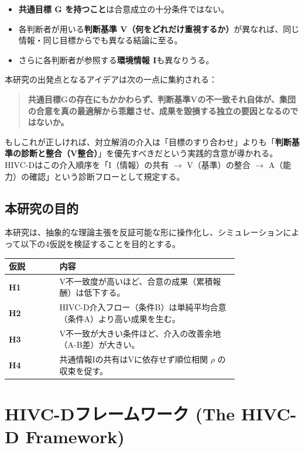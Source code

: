 \documentclass[11pt]{ltjsarticle}
\begin{document}
\begin{itemize}[nosep]
  \item \textbf{共通目標 G を持つこと}は合意成立の十分条件ではない。
  \item 各判断者が用いる\textbf{判断基準 V（何をどれだけ重視するか）}が異なれば、同じ情報・同じ目標からでも異なる結論に至る。
  \item さらに各判断者が参照する\textbf{環境情報 I}も異なりうる。
\end{itemize}

本研究の出発点となるアイデアは次の一点に集約される：

\begin{quote}
\textbf{共通目標Gの存在にもかかわらず、判断基準Vの不一致それ自体が、集団の合意を真の最適解から乖離させ、成果を毀損する独立の要因となるのではないか。}
\end{quote}

もしこれが正しければ、対立解消の介入は「目標のすり合わせ」よりも「\textbf{判断基準の診断と整合（V整合）}」を優先すべきだという実践的含意が導かれる。HIVC-Dはこの介入順序を「I（情報）の共有 $\to$ V（基準）の整合 $\to$ A（能力）の確認」という診断フローとして規定する。

\subsection{本研究の目的}

本研究は、抽象的な理論主張を反証可能な形に操作化し、シミュレーションによって以下の4仮説を検証することを目的とする。

\begin{longtable}{@{}l p{0.78\linewidth}@{}}
\toprule
仮説 & 内容 \\
\midrule
\textbf{H1} & V不一致度が高いほど、合意の成果（累積報酬）は低下する。 \\
\textbf{H2} & HIVC-D介入フロー（条件B）は単純平均合意（条件A）より高い成果を生む。 \\
\textbf{H3} & V不一致が大きい条件ほど、介入の改善余地（A-B差）が大きい。 \\
\textbf{H4} & 共通情報Iの共有はVに依存せず順位相関 $\rho$ の収束を促す。 \\
\bottomrule
\end{longtable}

\section{HIVC-Dフレームワーク (The HIVC-D Framework)}
\end{document}
